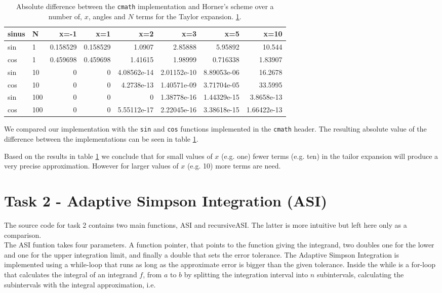 \documentclass[paper=a4, fontsize=11pt]{article} %
\begin{document}
\begin{table}[H]
\begin{tabular}{ l | l | r r r r r r}
  sinus & N   & x=-1     & x=1      & x=2         & x=3         & x=5         & x=10        \\
  \hline
  sin   & 1   & 0.158529 & 0.158529 & 1.0907      & 2.85888     & 5.95892     & 10.544      \\
  cos   & 1   & 0.459698 & 0.459698 & 1.41615     & 1.98999     & 0.716338    & 1.83907     \\
  sin   & 10  & 0        & 0        & 4.08562e-14 & 2.01152e-10 & 8.89053e-06 & 16.2678     \\
  cos   & 10  & 0        & 0        & 4.2738e-13  & 1.40571e-09 & 3.71704e-05 & 33.5995     \\
  sin   & 100 & 0        & 0        & 0           & 1.38778e-16 & 1.44329e-15 & 3.8658e-13  \\
  cos   & 100 & 0        & 0        & 5.55112e-17 & 2.22045e-16 & 3.38618e-15 & 1.66422e-13 \\
\end{tabular}
\caption{ Absolute difference between the \lstinline$cmath$
  implementation and Horner's scheme over a number of, $x$, angles and
  $N$ terms for the Taylor expansion.  \ref{tab:t1-errors}.}
\label{tab:t1-errors}
\end{table}


We compared our implementation with the \lstinline$sin$ and
\lstinline$cos$ functions implemented in the \lstinline$cmath$
header. The resulting absolute value of the difference between the
implementations can be seen in table \ref{tab:t1-errors}.

Based on the results in table \ref{tab:t1-errors} we conclude that for
small values of $x$ (e.g. one) fewer terms (e.g. ten) in the tailor
expansion will produce a very precise approximation. However for
larger values of $x$ (e.g. 10) more terms are need.


\section{Task 2 - Adaptive Simpson Integration (ASI)}


The source code for task 2 contains two main functions, ASI and recursiveASI. The latter is more intuitive but left here only as a comparison.\\

The ASI funtion takes four parameters. A function pointer, that points to the function giving the integrand, two doubles one for the lower and one  for the upper integration limit, and finally a double that sets the error tolerance. The Adaptive Simpson Integration is implemented using a while-loop that runs as long as the approximate error is bigger than the given tolerance. Inside the while is a for-loop that calculates the integral of an integrand $f$, from $a$ to $b$ by splitting the integration interval into $n$ subintervals, calculating the subintervals with the integral approximation, i.e.
\end{document}
